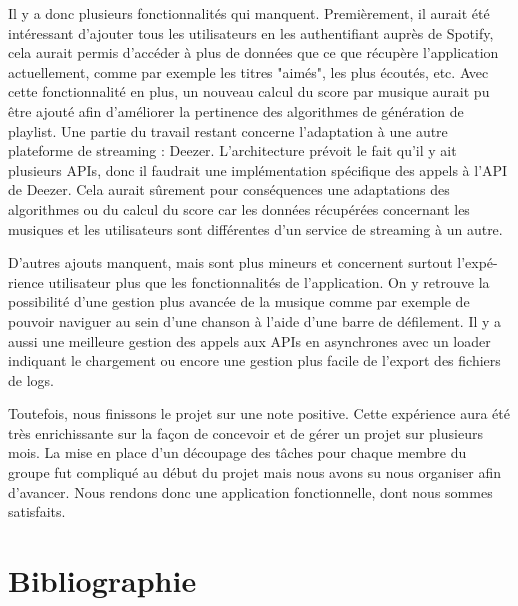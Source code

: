 \documentclass{article}
\begin{document}
        Il y a donc plusieurs fonctionnalités qui manquent. Premièrement, il aurait été intéressant d'ajouter tous les utilisateurs en les authentifiant auprès de Spotify, cela aurait permis d'accéder à plus de données que ce que récupère l'application actuellement, comme par exemple les titres "aimés", les plus écoutés, etc. Avec cette fonctionnalité en plus, un nouveau calcul du score par musique aurait pu être ajouté afin d'améliorer la pertinence des algorithmes de génération de playlist. Une partie du travail restant concerne l'adaptation à une autre plateforme de streaming : Deezer. L'architecture prévoit le fait qu'il y ait plusieurs APIs, donc il faudrait une implémentation spécifique des appels à l'API de Deezer. Cela aurait sûrement pour conséquences une adaptations des algorithmes ou du calcul du score car les données récupérées concernant les musiques et les utilisateurs sont différentes d'un service de streaming à un autre.
        
        D'autres ajouts manquent, mais sont plus mineurs et concernent surtout l'expé- rience utilisateur plus que les fonctionnalités de l'application. On y retrouve la possibilité d'une gestion plus avancée de la musique comme par exemple de pouvoir naviguer au sein d'une chanson à l'aide d'une barre de défilement. Il y a aussi une meilleure gestion des appels aux APIs en asynchrones avec un loader indiquant le chargement ou encore une gestion plus facile de l'export des fichiers de logs.
        \newline
        
        Toutefois, nous finissons le projet sur une note positive. Cette expérience aura été très enrichissante sur la façon de concevoir et de gérer un projet sur plusieurs mois. La mise en place d'un découpage des tâches pour chaque membre du groupe fut compliqué au début du projet mais nous avons su nous organiser afin d'avancer. Nous rendons donc une application fonctionnelle, dont nous sommes satisfaits.
			
		\section{Bibliographie}
		
						
								
\end{document}
